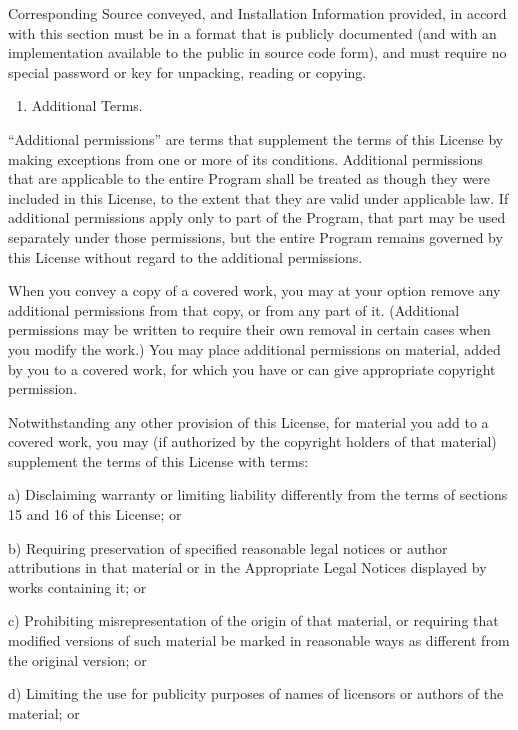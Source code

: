 \documentclass[letterpaper,10pt,english]{sphinxmanual}
\begin{document}
Corresponding Source conveyed, and Installation Information provided,
in accord with this section must be in a format that is publicly
documented (and with an implementation available to the public in
source code form), and must require no special password or key for
unpacking, reading or copying.
\begin{enumerate}
%
\setcounter{enumi}{6}
\item {} 
Additional Terms.

\end{enumerate}

“Additional permissions” are terms that supplement the terms of this
License by making exceptions from one or more of its conditions.
Additional permissions that are applicable to the entire Program shall
be treated as though they were included in this License, to the extent
that they are valid under applicable law.  If additional permissions
apply only to part of the Program, that part may be used separately
under those permissions, but the entire Program remains governed by
this License without regard to the additional permissions.

When you convey a copy of a covered work, you may at your option
remove any additional permissions from that copy, or from any part of
it.  (Additional permissions may be written to require their own
removal in certain cases when you modify the work.)  You may place
additional permissions on material, added by you to a covered work,
for which you have or can give appropriate copyright permission.

Notwithstanding any other provision of this License, for material you
add to a covered work, you may (if authorized by the copyright holders of
that material) supplement the terms of this License with terms:

a) Disclaiming warranty or limiting liability differently from the
terms of sections 15 and 16 of this License; or

b) Requiring preservation of specified reasonable legal notices or
author attributions in that material or in the Appropriate Legal
Notices displayed by works containing it; or

c) Prohibiting misrepresentation of the origin of that material, or
requiring that modified versions of such material be marked in
reasonable ways as different from the original version; or

d) Limiting the use for publicity purposes of names of licensors or
authors of the material; or
\end{document}
